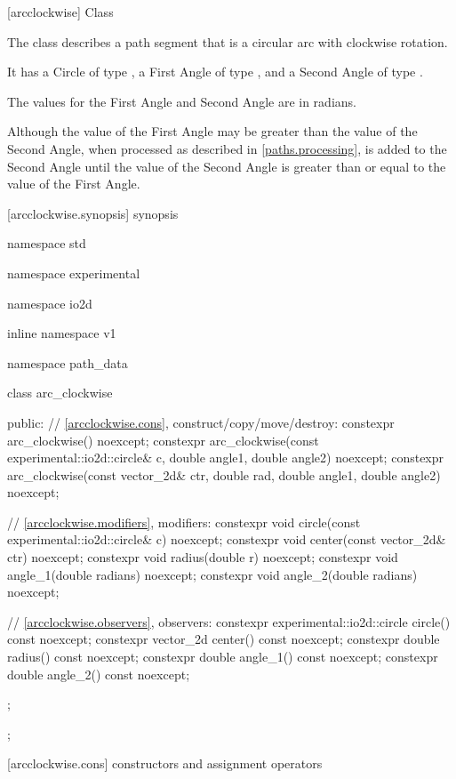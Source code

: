  [arcclockwise] {Class }

\pnum
{}
The class  describes a path segment that is a circular arc with clockwise rotation.

\pnum
It has a Circle of type , a First Angle of type , and a Second Angle of type .

\pnum
The values for the First Angle and Second Angle are in radians.

\pnum
\begin{note}
Although the value of the First Angle may be greater than the value of the Second Angle, when processed as described in \ref{paths.processing},  is added to the Second Angle until the value of the Second Angle is greater than or equal to the value of the First Angle.
\end{note}

 [arcclockwise.synopsis] { synopsis}

\begin{codeblock}
namespace std { namespace experimental { namespace io2d { inline namespace v1 {
  namespace path_data {
    class arc_clockwise {
    public:
      // \ref{arcclockwise.cons}, construct/copy/move/destroy:
      constexpr arc_clockwise() noexcept;
      constexpr arc_clockwise(const experimental::io2d::circle& c,
        double angle1, double angle2) noexcept;
      constexpr arc_clockwise(const vector_2d& ctr, double rad,
        double angle1, double angle2) noexcept;

      // \ref{arcclockwise.modifiers}, modifiers:
      constexpr void circle(const experimental::io2d::circle& c) noexcept;
      constexpr void center(const vector_2d& ctr) noexcept;
      constexpr void radius(double r) noexcept;
      constexpr void angle_1(double radians) noexcept;
      constexpr void angle_2(double radians) noexcept;

      // \ref{arcclockwise.observers}, observers:
      constexpr experimental::io2d::circle circle() const noexcept;
      constexpr vector_2d center() const noexcept;
      constexpr double radius() const noexcept;
      constexpr double angle_1() const noexcept;
      constexpr double angle_2() const noexcept;
    };
  };
} } } }
\end{codeblock}

 [arcclockwise.cons] { constructors and assignment operators}


